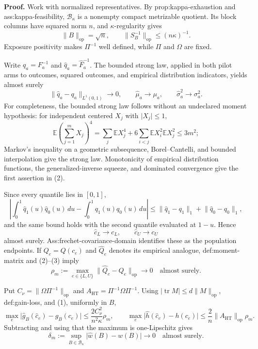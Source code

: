 \textbf{Proof.}
Work with normalized representatives.  By prop:kappa-exhaustion and ass:kappa-feasibility, \(\mathcal B_\kappa\) is a nonempty compact metrizable quotient.  Its block columns have squared norm \(n\), and \(\kappa\)-regularity gives
\[
 \lVert B\rVert_{\mathrm{op}}=\sqrt n,
 \qquad \lVert S_B^{-1}\rVert_{\mathrm{op}}\le(n\kappa)^{-1}.
 \tag{1}
\]
Exposure positivity makes \(\Pi^{-1}\) well defined, while \(\Pi\) and \(\Omega\) are fixed.

Write \(q_a=F_a^{-1}\) and \(\widehat q_a=\widehat F_a^{-1}\).  The bounded strong law, applied in both pilot arms to outcomes, squared outcomes, and empirical distribution indicators, yields almost surely
\[
 \lVert\widehat q_a-q_a\rVert_{L^1(0,1)}\to0,
 \qquad \widehat\mu_a\to\mu_a,
 \qquad \widehat\sigma_a^2\to\sigma_a^2.
 \tag{2}
\]
For completeness, the bounded strong law follows without an undeclared moment hypothesis: for independent centered \(X_j\) with \(\lvert X_j\rvert\le1\),
\[
 \mathbb E\left(\sum_{j=1}^mX_j\right)^4
 =\sum_j\mathbb EX_j^4+6\sum_{i<j}\mathbb EX_i^2\mathbb EX_j^2\le3m^2;
\]
Markov's inequality on a geometric subsequence, Borel--Cantelli, and bounded interpolation give the strong law.  Monotonicity of empirical distribution functions, the generalized-inverse squeeze, and dominated convergence give the first assertion in (2).

Since every quantile lies in \([0,1]\),
\[
 \left|\int_0^1\widehat q_1(u)\widehat q_0(u)\,du
 -\int_0^1q_1(u)q_0(u)\,du\right|
 \le\lVert\widehat q_1-q_1\rVert_1+\lVert\widehat q_0-q_0\rVert_1,
\]
and the same bound holds with the second quantile evaluated at \(1-u\).  Hence
\[
 \widehat c_L\to c_L,
 \qquad \widehat c_U\to c_U
 \tag{3}
\]
almost surely.  Ass:frechet-covariance-domain identifies these as the population endpoints.  If \(Q_e=Q(c_e)\) and \(\widehat Q_e\) denotes its empirical analogue, def:moment-matrix and (2)--(3) imply
\[
 \rho_m:=\max_{e\in\{L,U\}}\lVert\widehat Q_e-Q_e\rVert_{\mathrm{op}}\to0
 \quad\text{almost surely}. \tag{4}
\]

Put \(C_\nu=\lVert\Omega\Pi^{-1}\rVert_{\mathrm{op}}\) and \(A_{\mathrm{HT}}=\Pi^{-1}\Omega\Pi^{-1}\).  Using \(\lvert\operatorname{tr}M\rvert\le d\lVert M\rVert_{\mathrm{op}}\), def:gain-loss, and (1), uniformly in \(B\),
\[
 \max_e\lvert\widehat g_B(\widehat c_e)-g_B(c_e)\rvert
 \le\frac{2C_\nu^2}{n^2\kappa}\rho_m,
\qquad
 \max_e\lvert\widehat h(\widehat c_e)-h(c_e)\rvert
 \le\frac2n\lVert A_{\mathrm{HT}}\rVert_{\mathrm{op}}\rho_m.
 \tag{5}
\]
Subtracting and using that the maximum is one-Lipschitz gives
\[
 \delta_m:=\sup_{B\in\mathcal B_\kappa}\lvert\widehat w(B)-w(B)\rvert\to0
 \quad\text{almost surely}. \tag{6}
\]

